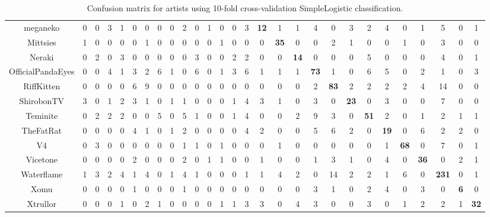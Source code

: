 \documentclass[article,pdftex,12pt,a4paper]{article}
\begin{document}
\begin{table}[htp]
\begin{tabular}{|| c | c c c c c c c c c c c c c c c c c c c c c c c c c c c ||}
meganeko & 0 & 0 & 3 & 1 & 0 & 0 & 0 & 0 & 2 & 0 & 1 & 0 & 0 & 3 & \textbf{12} & 1 & 1 & 4 & 0 & 3 & 2 & 4 & 0 & 1 & 5 & 0 & 1 \\ 
Mittsies & 1 & 0 & 0 & 0 & 0 & 1 & 0 & 0 & 0 & 0 & 0 & 1 & 0 & 0 & 0 & \textbf{35} & 0 & 0 & 2 & 1 & 0 & 0 & 1 & 0 & 3 & 0 & 0 \\ 
Neraki & 0 & 2 & 0 & 3 & 0 & 0 & 0 & 0 & 0 & 3 & 0 & 0 & 2 & 2 & 0 & 0 & \textbf{14} & 0 & 0 & 0 & 5 & 0 & 0 & 0 & 4 & 0 & 1 \\ 
OfficialPandaEyes & 0 & 0 & 4 & 1 & 3 & 2 & 6 & 1 & 0 & 6 & 0 & 1 & 3 & 6 & 1 & 1 & 1 & \textbf{73} & 1 & 0 & 6 & 5 & 0 & 2 & 1 & 0 & 3 \\ 
RiffKitten & 0 & 0 & 0 & 0 & 6 & 9 & 0 & 0 & 0 & 0 & 0 & 0 & 0 & 0 & 0 & 0 & 0 & 2 & \textbf{83} & 2 & 2 & 2 & 2 & 4 & 14 & 0 & 0 \\ 
ShirobonTV & 3 & 0 & 1 & 2 & 3 & 1 & 0 & 1 & 1 & 0 & 0 & 0 & 1 & 4 & 3 & 1 & 0 & 3 & 0 & \textbf{23} & 0 & 3 & 0 & 0 & 7 & 0 & 0 \\ 
Teminite & 0 & 2 & 2 & 2 & 0 & 0 & 5 & 0 & 5 & 1 & 0 & 0 & 1 & 4 & 0 & 0 & 2 & 9 & 3 & 0 & \textbf{51} & 2 & 0 & 1 & 2 & 1 & 1 \\ 
TheFatRat & 0 & 0 & 0 & 0 & 4 & 1 & 0 & 1 & 2 & 0 & 0 & 0 & 0 & 4 & 2 & 0 & 0 & 5 & 6 & 2 & 0 & \textbf{19} & 0 & 6 & 2 & 2 & 0 \\ 
V4 & 0 & 3 & 0 & 0 & 0 & 0 & 0 & 0 & 1 & 1 & 0 & 1 & 0 & 0 & 0 & 1 & 0 & 0 & 0 & 0 & 0 & 1 & \textbf{68} & 0 & 7 & 0 & 1 \\ 
Vicetone & 0 & 0 & 0 & 0 & 2 & 0 & 0 & 0 & 2 & 0 & 1 & 1 & 0 & 0 & 1 & 0 & 0 & 1 & 3 & 1 & 0 & 4 & 0 & \textbf{36} & 0 & 2 & 1 \\ 
Waterflame & 1 & 3 & 2 & 4 & 1 & 4 & 0 & 1 & 4 & 1 & 0 & 0 & 0 & 1 & 1 & 4 & 2 & 0 & 14 & 2 & 2 & 1 & 6 & 0 & \textbf{231} & 0 & 1 \\ 
Xomu & 0 & 0 & 0 & 0 & 1 & 0 & 0 & 0 & 1 & 0 & 0 & 0 & 0 & 0 & 0 & 0 & 0 & 3 & 1 & 0 & 2 & 4 & 0 & 3 & 0 & \textbf{6} & 0 \\ 
Xtrullor & 0 & 0 & 0 & 1 & 0 & 2 & 1 & 0 & 0 & 0 & 0 & 1 & 1 & 3 & 3 & 0 & 4 & 3 & 0 & 0 & 3 & 0 & 1 & 2 & 2 & 1 & \textbf{32} \\ [1ex]
\hline
\end{tabular}
\caption{Confusion matrix for artists using 10-fold cross-validation SimpleLogistic classification.}
\label{table_cm1}
\end{table}
\end{document}
